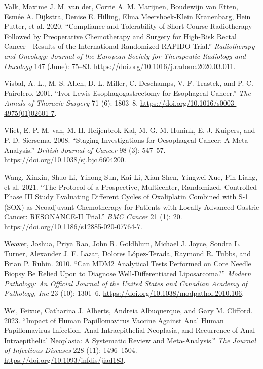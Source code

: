 \documentclass[
  letterpaper,
]{scrbook}
\newlength{\cslhangindent}
\newenvironment{CSLReferences}[2] %
 {\begin{list}{}{%
  \setlength{\itemindent}{0pt}
  \setlength{\leftmargin}{0pt}
  \setlength{\parsep}{0pt}
  \ifodd #1
   \setlength{\leftmargin}{\cslhangindent}
   \setlength{\itemindent}{-1\cslhangindent}
  \fi
  \setlength{\itemsep}{#2\baselineskip}}}
 {\end{list}}
\begin{document}
\begin{CSLReferences}{1}{0}
Valk, Maxime J. M. van der, Corrie A. M. Marijnen, Boudewijn van Etten,
Esmée A. Dijkstra, Denise E. Hilling, Elma Meershoek-Klein Kranenbarg,
Hein Putter, et al. 2020. {``Compliance and Tolerability of Short-Course
Radiotherapy Followed by Preoperative Chemotherapy and Surgery for
High-Risk Rectal Cancer - {Results} of the International Randomized
{RAPIDO}-Trial.''} \emph{Radiotherapy and Oncology: Journal of the
European Society for Therapeutic Radiology and Oncology} 147 (June):
75--83. \url{https://doi.org/10.1016/j.radonc.2020.03.011}.

Visbal, A. L., M. S. Allen, D. L. Miller, C. Deschamps, V. F. Trastek,
and P. C. Pairolero. 2001. {``Ivor {Lewis} Esophagogastrectomy for
Esophageal Cancer.''} \emph{The Annals of Thoracic Surgery} 71 (6):
1803--8. \url{https://doi.org/10.1016/s0003-4975(01)02601-7}.

Vliet, E. P. M. van, M. H. Heijenbrok-Kal, M. G. M. Hunink, E. J.
Kuipers, and P. D. Siersema. 2008. {``Staging Investigations for
Oesophageal Cancer: A Meta-Analysis.''} \emph{British Journal of Cancer}
98 (3): 547--57. \url{https://doi.org/10.1038/sj.bjc.6604200}.

Wang, Xinxin, Shuo Li, Yihong Sun, Kai Li, Xian Shen, Yingwei Xue, Pin
Liang, et al. 2021. {``The Protocol of a Prospective, Multicenter,
Randomized, Controlled Phase {III} Study Evaluating Different Cycles of
Oxaliplatin Combined with {S}-1 ({SOX}) as Neoadjuvant Chemotherapy for
Patients with Locally Advanced Gastric Cancer: {RESONANCE}-{II}
Trial.''} \emph{BMC Cancer} 21 (1): 20.
\url{https://doi.org/10.1186/s12885-020-07764-7}.

Weaver, Joshua, Priya Rao, John R. Goldblum, Michael J. Joyce, Sondra L.
Turner, Alexander J. F. Lazar, Dolores López-Terada, Raymond R. Tubbs,
and Brian P. Rubin. 2010. {``Can {MDM2} Analytical Tests Performed on
Core Needle Biopsy Be Relied Upon to Diagnose Well-Differentiated
Liposarcoma?''} \emph{Modern Pathology: An Official Journal of the
United States and Canadian Academy of Pathology, Inc} 23 (10): 1301--6.
\url{https://doi.org/10.1038/modpathol.2010.106}.

Wei, Feixue, Catharina J. Alberts, Andreia Albuquerque, and Gary M.
Clifford. 2023. {``Impact of {Human} {Papillomavirus} {Vaccine}
{Against} {Anal} {Human} {Papillomavirus} {Infection}, {Anal}
{Intraepithelial} {Neoplasia}, and {Recurrence} of {Anal}
{Intraepithelial} {Neoplasia}: {A} {Systematic} {Review} and
{Meta}-Analysis.''} \emph{The Journal of Infectious Diseases} 228 (11):
1496--1504. \url{https://doi.org/10.1093/infdis/jiad183}.


\end{CSLReferences}
\end{document}
